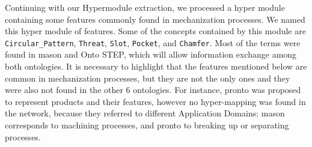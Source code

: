 Continuing with our Hypermodule extraction, we processed a hyper module containing some features commonly found in mechanization processes. We named this hyper module of features. Some of the concepts contained by this module are \texttt{Circular\_Pattern}, \texttt{Threat}, \texttt{Slot}, \texttt{Pocket}, and \texttt{Chamfer}. Most of the terms were found in \gls{mason} and Onto STEP, which will allow information exchange among both ontologies. It is necessary to highlight that the features mentioned below are common in mechanization processes, but they are not the only ones and they were also not found in the other 6 ontologies. For instance, \gls{pronto} was proposed to represent products and their features, however no hyper-mapping was found in the network, because   they referred to different Application Domains: \gls{mason} corresponds to machining processes, and \gls{pronto} to breaking up or separating processes.

